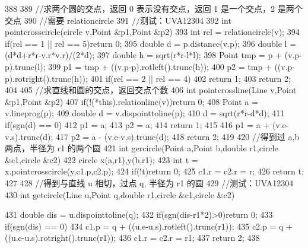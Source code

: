 \documentclass[11pt]{article}
\begin{document}
\begin{Code}
{{388       }
389       //求两个圆的交点，返回 0 表示没有交点，返回 1 是一个交点，2 是两个交点
390       //需要 relationcircle
391       //测试：UVA12304
392       int pointcrosscircle(circle v,Point &p1,Point &p2){
393           int rel = relationcircle(v);
394           if(rel == 1 || rel == 5)return 0;
395           double d = p.distance(v.p);
396           double l = (d*d+r*r-v.r*v.r)/(2*d);
397           double h = sqrt(r*r-l*l);
398           Point tmp = p + (v.p-p).trunc(l);
399           p1 = tmp + ((v.p-p).rotleft().trunc(h));
400           p2 = tmp + ((v.p-p).rotright().trunc(h));
401           if(rel == 2 || rel == 4)
402               return 1;
403           return 2;
404       }
405       //求直线和圆的交点，返回交点个数
406       int pointcrossline(Line v,Point &p1,Point &p2){
407           if(!(*this).relationline(v))return 0;
408           Point a = v.lineprog(p);
409           double d = v.dispointtoline(p);
410           d = sqrt(r*r-d*d);
411           if(sgn(d) == 0){
412               p1 = a;
413               p2 = a;
414               return 1;
415           }
416           p1 = a + (v.e-v.s).trunc(d);
417           p2 = a - (v.e-v.s).trunc(d);
418           return 2;
419       }
420       //得到过 a,b 两点，半径为 r1 的两个圆
421       int gercircle(Point a,Point b,double r1,circle &c1,circle &c2){
422           circle x(a,r1),y(b,r1);
423           int t = x.pointcrosscircle(y,c1.p,c2.p);
424           if(!t)return 0;
425           c1.r = c2.r = r;
426           return t;
427       }
428       //得到与直线 u 相切，过点 q, 半径为 r1 的圆
429       //测试：UVA12304
430       int getcircle(Line u,Point q,double r1,circle &c1,circle &c2){
431           double dis = u.dispointtoline(q);
432           if(sgn(dis-r1*2)>0)return 0;
433           if(sgn(dis) == 0){
434               c1.p = q + ((u.e-u.s).rotleft().trunc(r1));
435               c2.p = q + ((u.e-u.s).rotright().trunc(r1));
436               c1.r = c2.r = r1;
437               return 2;
438           }


}}
\end{Code}
\end{document}
